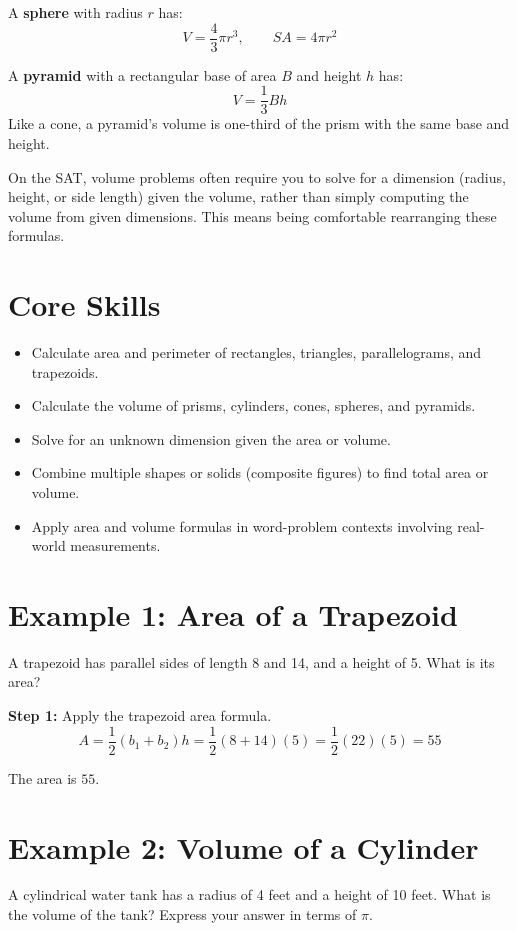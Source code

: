 \documentclass[14pt]{extarticle}
\begin{document}
A \textbf{sphere} with radius \(r\) has:
\[
V = \frac{4}{3}\pi r^3, \qquad SA = 4\pi r^2
\]

A \textbf{pyramid} with a rectangular base of area \(B\) and height \(h\) has:
\[
V = \frac{1}{3}Bh
\]
Like a cone, a pyramid's volume is one-third of the prism with the same base and height.

On the SAT, volume problems often require you to solve for a dimension (radius, height, or side length) given the volume, rather than simply computing the volume from given dimensions. This means being comfortable rearranging these formulas.

\section*{Core Skills}
\begin{itemize}
  \item Calculate area and perimeter of rectangles, triangles, parallelograms, and trapezoids.
  \item Calculate the volume of prisms, cylinders, cones, spheres, and pyramids.
  \item Solve for an unknown dimension given the area or volume.
  \item Combine multiple shapes or solids (composite figures) to find total area or volume.
  \item Apply area and volume formulas in word-problem contexts involving real-world measurements.
\end{itemize}

\section*{Example 1: Area of a Trapezoid}

A trapezoid has parallel sides of length 8 and 14, and a height of 5. What is its area?

\textbf{Step 1:} Apply the trapezoid area formula.
\[
A = \frac{1}{2}(b_1 + b_2)h = \frac{1}{2}(8 + 14)(5) = \frac{1}{2}(22)(5) = 55
\]

The area is \(\boxed{55}\).

\section*{Example 2: Volume of a Cylinder}

A cylindrical water tank has a radius of 4 feet and a height of 10 feet. What is the volume of the tank? Express your answer in terms of \(\pi\).
\end{document}
